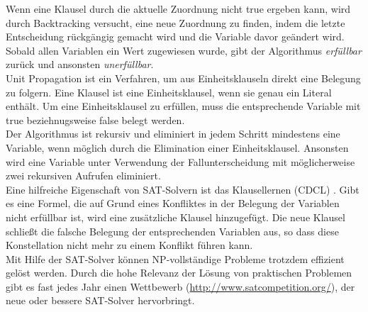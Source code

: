 \documentclass[a4,abstract=on]{scrartcl}
\begin{document}
Wenn eine Klausel durch die aktuelle Zuordnung nicht true ergeben kann, wird durch Backtracking versucht, eine neue Zuordnung zu finden, indem die letzte Entscheidung rückgängig gemacht wird und die Variable davor geändert wird. 
Sobald allen Variablen ein Wert zugewiesen wurde, gibt der Algorithmus \emph{erfüllbar} zurück und ansonsten \emph{unerfüllbar}.\\
Unit Propagation ist ein Verfahren, um aus Einheitsklauseln direkt eine Belegung zu folgern. Eine Klausel ist eine Einheitsklausel, wenn sie genau ein Literal enthält. Um eine Einheitsklausel zu erfüllen, muss die entsprechende Variable mit true beziehnugsweise false belegt werden.\\
Der Algorithmus ist rekursiv und eliminiert in jedem Schritt mindestens eine Variable, wenn möglich durch die Elimination einer Einheitsklausel. Ansonsten wird eine Variable unter Verwendung der Fallunterscheidung mit möglicherweise zwei rekursiven Aufrufen eliminiert.\\
Eine hilfreiche Eigenschaft von SAT-Solvern ist das Klausellernen (CDCL) \cite[][]{cdcl}. Gibt es eine Formel, die auf Grund eines Konfliktes in der Belegung der Variablen nicht erfüllbar ist, wird eine zusätzliche Klausel hinzugefügt. Die neue Klausel schließt die falsche Belegung der entsprechenden Variablen aus, so dass diese Konstellation nicht mehr zu einem Konflikt führen kann.\\
Mit Hilfe der SAT-Solver können NP-vollständige Probleme trotzdem effizient gelöst werden. Durch die hohe Relevanz der Lösung von praktischen Problemen gibt es fast jedes Jahr einen Wettbewerb (\url{http://www.satcompetition.org/}), der neue oder bessere SAT-Solver hervorbringt.

\end{document}
